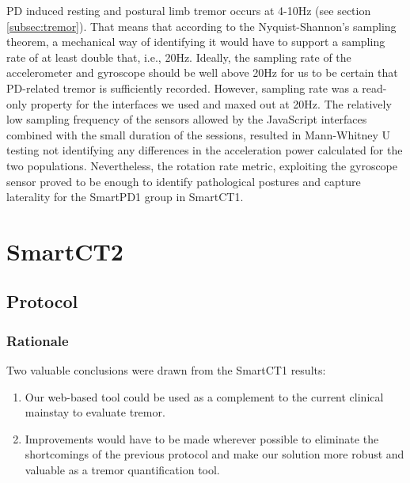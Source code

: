 \gls{PD} induced resting and postural limb tremor occurs at 4-10Hz (see section \ref{subsec:tremor}). That means that according to the Nyquist-Shannon's sampling theorem, a mechanical way of identifying it would have to support a sampling rate of at least double that, i.e., 20Hz. Ideally, the sampling rate of the accelerometer and gyroscope should be well above 20Hz for us to be certain that \gls{PD}-related tremor is sufficiently recorded. However, sampling rate was a read-only property for the interfaces we used and maxed out at 20Hz. The relatively low sampling frequency of the sensors allowed by the JavaScript interfaces combined with the small duration of the sessions, resulted in Mann-Whitney U testing not identifying any differences in the acceleration power calculated for the two populations. Nevertheless, the rotation rate metric, exploiting the gyroscope sensor proved to be enough to identify pathological postures and capture laterality for the \gls{SmartPD1} group in \gls{SmartCT1}. 



\section{SmartCT2}
\label{sec:SmartCT2}

\subsection{Protocol}
\label{subsec:SmartCT2Protocol}

\subsubsection{Rationale}
\label{subsubsec:smartCT2Rationale}
Two valuable conclusions were drawn from the \gls{SmartCT1} results:

\begin{enumerate}
\item Our web-based tool could be used as a complement to the current clinical mainstay to evaluate tremor.
\item Improvements would have to be made wherever possible to eliminate the shortcomings of the previous protocol and make our solution more robust and valuable as a tremor quantification tool. 
\end{enumerate}

